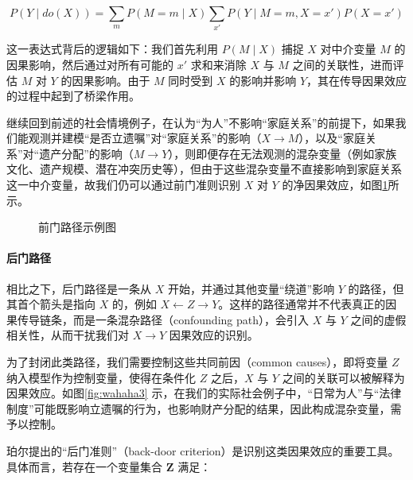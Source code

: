 \begin{equation}
P(Y \mid do(X)) = \sum_{m} P(M = m \mid X) \sum_{x'} P(Y \mid M = m, X = x') P(X = x')
\end{equation}

这一表达式背后的逻辑如下：我们首先利用 $P(M \mid X)$ 捕捉 $X$ 对中介变量 $M$ 的因果影响，然后通过对所有可能的 $x'$ 求和来消除 $X$ 与 $M$ 之间的关联性，进而评估 $M$ 对 $Y$ 的因果影响。由于 $M$ 同时受到 $X$ 的影响并影响 $Y$，其在传导因果效应的过程中起到了桥梁作用。

继续回到前述的社会情境例子，在认为“为人”不影响“家庭关系”的前提下，如果我们能观测并建模“是否立遗嘱”对“家庭关系”的影响（$X \rightarrow M$），以及“家庭关系”对“遗产分配”的影响（$M \rightarrow Y$），则即便存在无法观测的混杂变量（例如家族文化、遗产规模、潜在冲突历史等），但由于这些混杂变量不直接影响到家庭关系这一中介变量，故我们仍可以通过前门准则识别 $X$ 对 $Y$ 的净因果效应，如图\ref{fig:wahaha2}所示。

\begin{figure}[ht]
	\centering
	\caption{前门路径示例图}
	\label{fig:wahaha2}
\end{figure}

\paragraph*{后门路径}

相比之下，后门路径是一条从 $X$ 开始，并通过其他变量“绕道”影响 $Y$ 的路径，但其首个箭头是指向 $X$ 的，例如 $X \leftarrow Z \rightarrow Y$。这样的路径通常并不代表真正的因果传导链条，而是一条混杂路径（confounding path），会引入 $X$ 与 $Y$ 之间的虚假相关性，从而干扰我们对 $X \rightarrow Y$ 因果效应的识别。

为了封闭此类路径，我们需要控制这些共同前因（common causes），即将变量 $Z$ 纳入模型作为控制变量，使得在条件化 $Z$ 之后，$X$ 与 $Y$ 之间的关联可以被解释为因果效应。如图\ref{fig:wahaha3} 示，在我们的实际社会例子中，“日常为人”与“法律制度”可能既影响立遗嘱的行为，也影响财产分配的结果，因此构成混杂变量，需予以控制。

珀尔提出的“后门准则”（back-door criterion）是识别这类因果效应的重要工具。具体而言，若存在一个变量集合 $\mathbf{Z}$ 满足：

